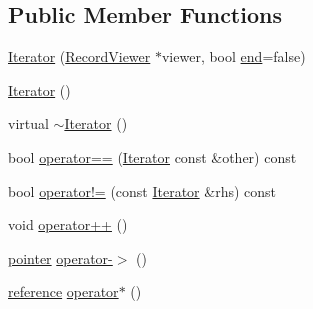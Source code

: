 \subsection*{Public Member Functions}
\begin{DoxyCompactItemize}
\item 
\hyperlink{classapollo_1_1cyber_1_1record_1_1RecordViewer_1_1Iterator_ac08d6746bb571e1830bb63873c0b84c2}{Iterator} (\hyperlink{classapollo_1_1cyber_1_1record_1_1RecordViewer}{Record\-Viewer} $\ast$viewer, bool \hyperlink{classapollo_1_1cyber_1_1record_1_1RecordViewer_a142bc45d0387f9982573aba250d3bebd}{end}=false)
\item 
\hyperlink{classapollo_1_1cyber_1_1record_1_1RecordViewer_1_1Iterator_a575b3b0b688618b2898caa82ffbfe420}{Iterator} ()
\item 
virtual \hyperlink{classapollo_1_1cyber_1_1record_1_1RecordViewer_1_1Iterator_a4be1cd45d37cdba7a2f7cb670d788f11}{$\sim$\-Iterator} ()
\item 
bool \hyperlink{classapollo_1_1cyber_1_1record_1_1RecordViewer_1_1Iterator_a12fe2b96833075c538f2d6ed30026d72}{operator==} (\hyperlink{classapollo_1_1cyber_1_1record_1_1RecordViewer_1_1Iterator}{Iterator} const \&other) const 
\item 
bool \hyperlink{classapollo_1_1cyber_1_1record_1_1RecordViewer_1_1Iterator_abf1b097103f74b27846f906b7e9c2bfe}{operator!=} (const \hyperlink{classapollo_1_1cyber_1_1record_1_1RecordViewer_1_1Iterator}{Iterator} \&rhs) const 
\item 
void \hyperlink{classapollo_1_1cyber_1_1record_1_1RecordViewer_1_1Iterator_a84e0cc6e08eb354ce6380d71c2f3e088}{operator++} ()
\item 
\hyperlink{classapollo_1_1cyber_1_1record_1_1RecordViewer_1_1Iterator_a9f3cbce1cbf35a09693e35abd4c21728}{pointer} \hyperlink{classapollo_1_1cyber_1_1record_1_1RecordViewer_1_1Iterator_ae934f4a9e60c2cab6d017f1e52691c28}{operator-\/$>$} ()
\item 
\hyperlink{classapollo_1_1cyber_1_1record_1_1RecordViewer_1_1Iterator_a670a19f28cd3f2db0e69d0167787021a}{reference} \hyperlink{classapollo_1_1cyber_1_1record_1_1RecordViewer_1_1Iterator_a91f936e4915f0398cfe59129c9cf22b0}{operator$\ast$} ()
\end{DoxyCompactItemize}
